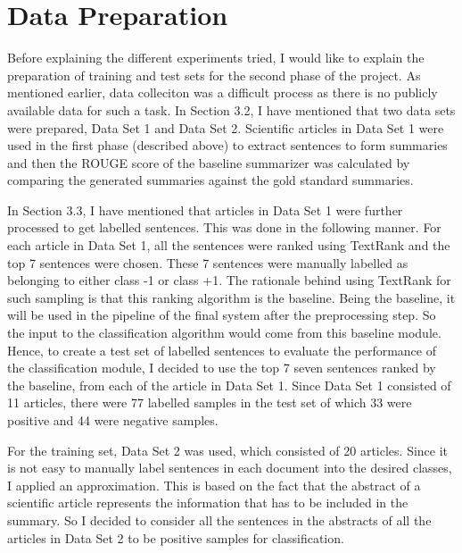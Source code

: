 \section{Data Preparation}
Before explaining the different experiments tried, I would like to explain the preparation of training and test sets for the second phase of the project.
As mentioned earlier, data colleciton was a difficult process as there is no publicly available data for such a task.
In Section 3.2, I have mentioned that two data sets were prepared, Data Set 1 and Data Set 2.
Scientific articles in Data Set 1 were used in the first phase (described above) to extract sentences to form summaries and then the ROUGE score of the baseline summarizer was calculated by comparing the generated summaries against the gold standard summaries.

In Section 3.3, I have mentioned that articles in Data Set 1 were further processed to get labelled sentences.
This was done in the following manner.
For each article in Data Set 1, all the sentences were ranked using TextRank and the top 7 sentences were chosen.
These 7 sentences were manually labelled as belonging to either class -1 or class +1.
The rationale behind using TextRank for such sampling is that this ranking algorithm is the baseline.
Being the baseline, it will be used in the pipeline of the final system after the preprocessing step.
So the input to the classification algorithm would come from this baseline module.
Hence, to create a test set of labelled sentences to evaluate the performance of the classification module, I decided to use the top 7 seven sentences ranked by the baseline, from each of the article in Data Set 1.
Since Data Set 1 consisted of 11 articles, there were 77 labelled samples in the test set of which 33 were positive and 44 were negative samples.

For the training set, Data Set 2 was used, which consisted of 20 articles.
Since it is not easy to manually label sentences in each document into the desired classes, I applied an approximation.
This is based on the fact that the abstract of a scientific article represents the information that has to be included in the summary.
So I decided to consider all the sentences in the abstracts of all the articles in Data Set 2 to be positive samples for classification.

